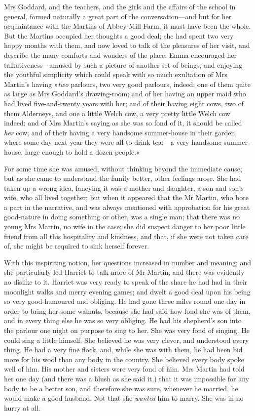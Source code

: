 Mrs Goddard, and the teachers, and the girls and the affairs of the school in general, formed naturally a great part of the conversation—and but for her acquaintance with the Martins of Abbey-Mill Farm, it must have been the whole. But the Martins occupied her thoughts a good deal; she had spent two very happy months with them, and now loved to talk of the pleasures of her visit, and describe the many comforts and wonders of the place. Emma encouraged her talkativeness—amused by such a picture of another set of beings, and enjoying the youthful simplicity which could speak with so much exultation of Mrs Martin's having »\textit{two} parlours, two very good parlours, indeed; one of them quite as large as Mrs Goddard's drawing-room; and of her having an upper maid who had lived five-and-twenty years with her; and of their having eight cows, two of them Alderneys, and one a little Welch cow, a very pretty little Welch cow indeed; and of Mrs Martin's saying as she was so fond of it, it should be called \textit{her} cow; and of their having a very handsome summer-house in their garden, where some day next year they were all to drink tea:—a very handsome summer-house, large enough to hold a dozen people.«

For some time she was amused, without thinking beyond the immediate cause; but as she came to understand the family better, other feelings arose. She had taken up a wrong idea, fancying it was a mother and daughter, a son and son's wife, who all lived together; but when it appeared that the Mr Martin, who bore a part in the narrative, and was always mentioned with approbation for his great good-nature in doing something or other, was a single man; that there was no young Mrs Martin, no wife in the case; she did suspect danger to her poor little friend from all this hospitality and kindness, and that, if she were not taken care of, she might be required to sink herself forever.

With this inspiriting notion, her questions increased in number and meaning; and she particularly led Harriet to talk more of Mr Martin, and there was evidently no dislike to it. Harriet was very ready to speak of the share he had had in their moonlight walks and merry evening games; and dwelt a good deal upon his being so very good-humoured and obliging. He had gone three miles round one day in order to bring her some walnuts, because she had said how fond she was of them, and in every thing else he was so very obliging. He had his shepherd's son into the parlour one night on purpose to sing to her. She was very fond of singing. He could sing a little himself. She believed he was very clever, and understood every thing. He had a very fine flock, and, while she was with them, he had been bid more for his wool than any body in the country. She believed every body spoke well of him. His mother and sisters were very fond of him. Mrs Martin had told her one day (and there was a blush as she said it,) that it was impossible for any body to be a better son, and therefore she was sure, whenever he married, he would make a good husband. Not that she \textit{wanted} him to marry. She was in no hurry at all.


